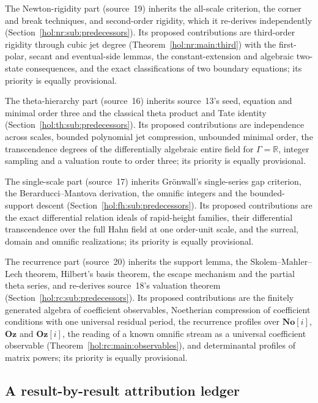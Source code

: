 \documentclass[11pt]{article}
\numberwithin{equation}{section}
\theoremstyle{definition}
\theoremstyle{remark}
\newcommand{\R}{\mathbb R}
\newcommand{\No}{\mathbf{No}}
\newcommand{\Oz}{\mathbf{Oz}}
\begin{document}
The Newton-rigidity part (source~19) inherits the all-scale criterion, the
corner and break techniques, and second-order rigidity, which it re-derives
independently (Section~\ref{hol:nr:sub:predecessors}). Its proposed
contributions are third-order rigidity through cubic jet degree
(Theorem~\ref{hol:nr:main:third}) with the first-polar, secant and
eventual-side lemmas, the constant-extension and algebraic two-state
consequences, and the exact classifications of two boundary equations; its
priority is equally provisional.

The theta-hierarchy part (source~16) inherits source~13's seed, equation and
minimal order three and the classical theta product and Tate identity
(Section~\ref{hol:th:sub:predecessors}). Its proposed contributions are
independence across scales, bounded polynomial jet compression, unbounded
minimal order, the transcendence degrees of the differentially algebraic
entire field for $\Gamma=\R$, integer sampling and a valuation route to order
three; its priority is equally provisional.

The single-scale part (source~17) inherits Gr\"onwall's single-series gap
criterion, the Berarducci--Mantova derivation, the omnific integers and the
bounded-support descent (Section~\ref{hol:fh:sub:predecessors}). Its proposed
contributions are the exact differential relation ideals of rapid-height
families, their differential transcendence over the full Hahn field at one
order-unit scale, and the surreal, domain and omnific realizations; its
priority is equally provisional.

The recurrence part (source~20) inherits the support lemma, the
Skolem--Mahler--Lech theorem, Hilbert's basis theorem, the escape mechanism and
the partial theta series, and re-derives source~18's valuation theorem
(Section~\ref{hol:rc:sub:predecessors}). Its proposed contributions are the
finitely generated algebra of coefficient observables, Noetherian compression
of coefficient conditions with one universal residual period, the recurrence
profiles over $\No[i]$, $\Oz$ and $\Oz[i]$, the reading of a known omnific
stream as a universal coefficient observable
(Theorem~\ref{hol:rc:main:observables}), and determinantal profiles of matrix
powers; its priority is equally provisional.

\subsection{A result-by-result attribution ledger}
\end{document}
